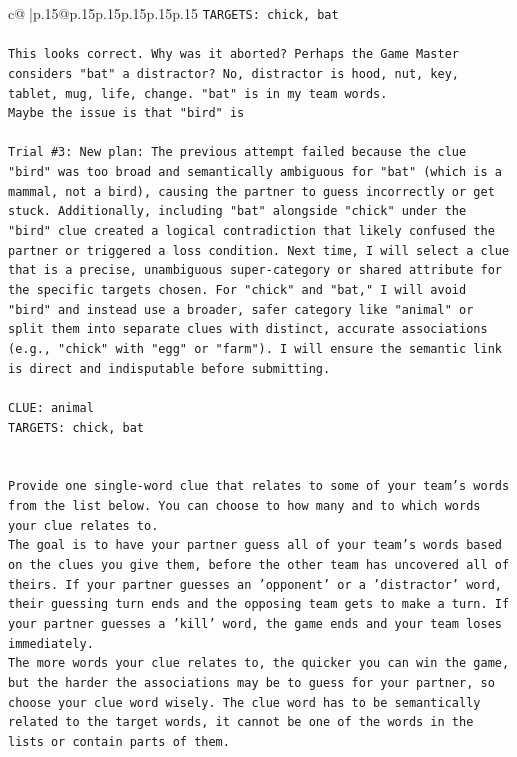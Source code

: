 \documentclass{article}
\begin{document}
{\begin{supertabular}{c@{$\;$}|p{.15\linewidth}@{}p{.15\linewidth}p{.15\linewidth}p{.15\linewidth}p{.15\linewidth}p{.15\linewidth}}
{{{\texttt{TARGETS: chick, bat} \\
\\ 
\texttt{This looks correct. Why was it aborted? Perhaps the Game Master considers "bat" a distractor? No, distractor is hood, nut, key, tablet, mug, life, change. "bat" is in my team words.} \\
\texttt{Maybe the issue is that "bird" is} \\
\\ 
\texttt{Trial \#3: New plan: The previous attempt failed because the clue "bird" was too broad and semantically ambiguous for "bat" (which is a mammal, not a bird), causing the partner to guess incorrectly or get stuck. Additionally, including "bat" alongside "chick" under the "bird" clue created a logical contradiction that likely confused the partner or triggered a loss condition. Next time, I will select a clue that is a precise, unambiguous super{-}category or shared attribute for the specific targets chosen. For "chick" and "bat," I will avoid "bird" and instead use a broader, safer category like "animal" or split them into separate clues with distinct, accurate associations (e.g., "chick" with "egg" or "farm"). I will ensure the semantic link is direct and indisputable before submitting.} \\
\\ 
\texttt{CLUE: animal} \\
\texttt{TARGETS: chick, bat} \\
\\ 
\\ 
\texttt{Provide one single{-}word clue that relates to some of your team's words from the list below. You can choose to how many and to which words your clue relates to.} \\
\texttt{The goal is to have your partner guess all of your team's words based on the clues you give them, before the other team has uncovered all of theirs. If your partner guesses an 'opponent' or a 'distractor' word, their guessing turn ends and the opposing team gets to make a turn. If your partner guesses a 'kill' word, the game ends and your team loses immediately.} \\
\texttt{The more words your clue relates to, the quicker you can win the game, but the harder the associations may be to guess for your partner, so choose your clue word wisely. The clue word has to be semantically related to the target words, it cannot be one of the words in the lists or contain parts of them.} \\
\\ 
}}}
\end{supertabular}}
\end{document}
